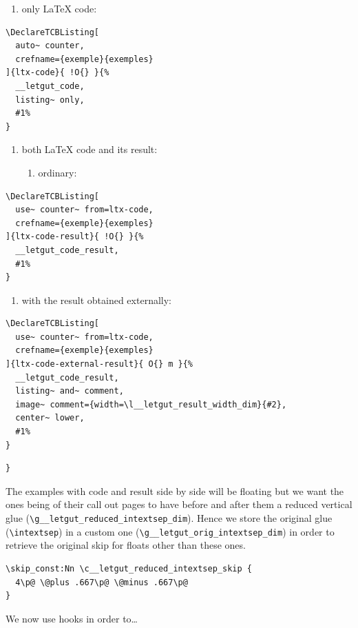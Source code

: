 \documentclass{letgut}
\begin{document}
\begin{enumerate}
\item only \LaTeX{} code:
\end{enumerate}
\begin{lstlisting}
\DeclareTCBListing[
  auto~ counter,
  crefname={exemple}{exemples}
]{ltx-code}{ !O{} }{%
  __letgut_code,
  listing~ only,
  #1%
}
\end{lstlisting}
\begin{enumerate}
\item both \LaTeX{} code and its result:
\begin{enumerate}
\item ordinary:
\end{enumerate}
\end{enumerate}
\begin{lstlisting}
\DeclareTCBListing[
  use~ counter~ from=ltx-code,
  crefname={exemple}{exemples}
]{ltx-code-result}{ !O{} }{%
  __letgut_code_result,
  #1%
}
\end{lstlisting}
\begin{enumerate}
\item with the result obtained externally:
\end{enumerate}
\begin{lstlisting}
\DeclareTCBListing[
  use~ counter~ from=ltx-code,
  crefname={exemple}{exemples}
]{ltx-code-external-result}{ O{} m }{%
  __letgut_code_result,
  listing~ and~ comment,
  image~ comment={width=\l__letgut_result_width_dim}{#2},
  center~ lower,
  #1%
}
\end{lstlisting}

\begin{lstlisting}
}
\end{lstlisting}

The examples with code and result side by side will be floating but we want the
ones being of their call out pages to have before and after them a reduced
vertical glue (\lstinline+\g__letgut_reduced_intextsep_dim+). Hence we store the original
glue (\lstinline+\intextsep+) in a custom one (\lstinline+\g__letgut_orig_intextsep_dim+) in order
to retrieve the original skip for floats other than these ones.

\begin{lstlisting}
\skip_const:Nn \c__letgut_reduced_intextsep_skip {
  4\p@ \@plus .667\p@ \@minus .667\p@
}
\end{lstlisting}

We now use hooks in order to\ldots{}
\end{document}
